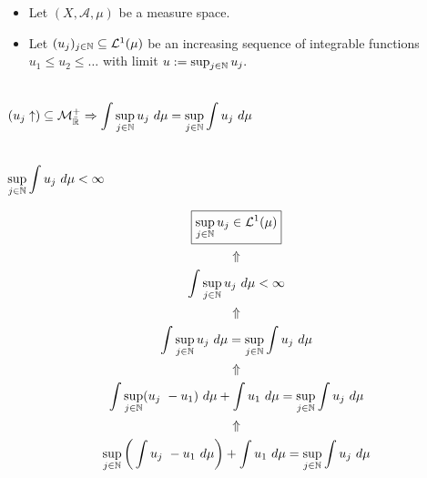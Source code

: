 \begin{minipage}[t]{0.45\textwidth}
\begin{given}
\begin{itemize}
\item  Let \((X,\mathcal{A},\mu )\) be a measure space.
\item  Let \((u_{j})_{j\in \Bbb{N}}\subseteq \mathcal{L}^1(\mu )\) be an increasing sequence of integrable functions \(u_{1}\leq u_{2}\leq \ldots \) with limit \(u:=\sup_{j\in \Bbb{N}}u_{j}.\)
\end{itemize}
\end{given}

\begin{tools}\\
\(\displaystyle
(u_{j}\uparrow )\subseteq \mathcal{M}_{\bar{\Bbb{R}}}^+\Rightarrow \int \sup_{j\in \Bbb{N}}u_{j}\  d\mu =\sup_{j\in \Bbb{N}}\int u_{j}\  d\mu 
\)
\end{tools}
\begin{assume} \\
\(\displaystyle \sup_{j\in \Bbb{N}} \int  u_{j}\  d\mu  <\infty  \)
\end{assume}
\end{minipage}
\begin{minipage}[t]{0.55\textwidth}
\vspace{-0.2in}
\begin{gather*}
\boxed{\sup_{j\in \Bbb{N}} u_{j} \in \mathcal{L}^1(\mu )} 
\\ \Uparrow  \\
\int  \sup_{j\in \Bbb{N}} u_{j}\  d\mu  <\infty  \\
\Uparrow  \\
\int \sup_{j\in \Bbb{N}} u_{j}\  d\mu  = \sup_{j\in \Bbb{N}} \int  u_{j}\  d\mu   \\
\Uparrow  \\
\int \sup_{j\in \Bbb{N}} (u_{j}\  - u_{1})\  d\mu   + \int  u_{1}\   d\mu  = \sup_{j\in \Bbb{N}} \int  u_{j}\  d\mu  \\
\Uparrow \\
\sup_{j\in \Bbb{N}}\bigg(\int  u_{j}\  - u_{1}\  d\mu \bigg)+ \int  u_{1}\   d\mu  = \sup_{j\in \Bbb{N}} \int  u_{j}\  d\mu   \\
\end{gather*}
\end{minipage}
\noindent\makebox[\linewidth]{\rule{\paperwidth}{0.4pt}}

\newpage

